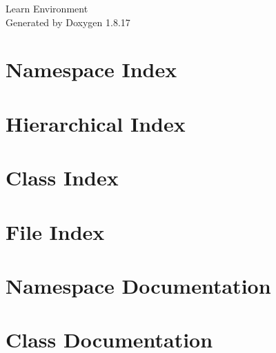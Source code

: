 \let\mypdfximage\pdfximage\def\pdfximage{\immediate\mypdfximage}\documentclass[twoside]{book}
\newcommand{\+}{\discretionary{\mbox{\scriptsize$\hookleftarrow$}}{}{}}
\newcommand{\clearemptydoublepage}{%
  \newpage{\pagestyle{empty}\cleardoublepage}%
}
\begin{document}
\hypersetup{pageanchor=false,
             bookmarksnumbered=true,
             pdfencoding=unicode
            }
\begin{titlepage}
\vspace*{7cm}
\begin{center}%
{\Large Learn Environment }\\
\vspace*{1cm}
{\large Generated by Doxygen 1.8.17}\\
\end{center}
\end{titlepage}
\clearemptydoublepage
{}
\tableofcontents
\clearemptydoublepage
{}
\hypersetup{pageanchor=true}

\chapter{Namespace Index}

\chapter{Hierarchical Index}

\chapter{Class Index}

\chapter{File Index}

\chapter{Namespace Documentation}


\chapter{Class Documentation}



















\end{document}
